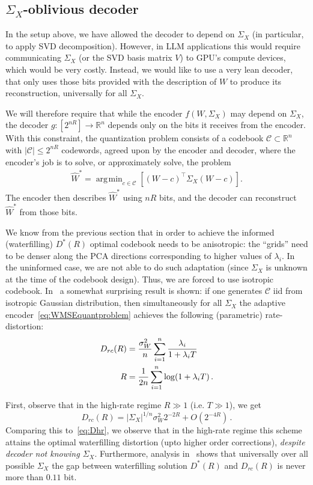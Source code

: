 \documentclass[journal]{IEEEtran}
\newcommand{\RR}{\mathbb{R}}
\newcommand{\m}{\mathcal}
\DeclareMathOperator*{\argmin}{\arg\!\min}
\begin{document}
\fi


\subsection{$\Sigma_X$-oblivious decoder}\label{sec:universal_decoder}

In the setup above, we have allowed the decoder to depend on $\Sigma_X$ (in particular, to apply
SVD decomposition). However, in LLM applications this would require communicating $\Sigma_X$ (or
the SVD basis matrix $V$) to GPU's compute devices, which would be very costly. Instead, we would
like to use a very lean decoder, that only uses those bits provided with the description of $W$ to
produce its reconstruction, universally for all $\Sigma_X$.

We will therefore require that while the encoder $f(W,\Sigma_X)$ may depend on $\Sigma_X$, the decoder $g:[2^{nR}]\to \RR^n$ depends only on the bits it receives from the encoder. With this constraint, the quantization problem consists of a codebook $\m{C}\subset\RR^n$ with $|\m{C}|\leq 2^{nR}$ codewords, agreed upon by the encoder and decoder, where the encoder's job is to solve, or approximately solve, the problem
\begin{align}
\hat{W}^*=\argmin_{c\in\m{C}}[(W-c)^\top \Sigma_X (W-c)].
\label{eq:WMSEquantproblem}
\end{align}
The encoder then describes $\hat{W}^*$ using $nR$ bits, and the decoder can reconstruct $\hat{W}^*$ from those bits.

We know from the previous section that in order to achieve the informed (waterfilling) $D^*(R)$
optimal codebook needs to be anisotropic: the ``grids'' need to be denser along the PCA directions
corresponding to higher values of $\lambda_i$. In the uninformed case, we are not able to do such
adaptation (since $\Sigma_X$ is unknown at the time of the codebook design). Thus, we are forced
to use isotropic codebook. In~\cite{HOP26} a somewhat
surprising result is shown: if one generates $\m{C}$ iid from isotropic Gaussian distribution,
then simultaneously for all $\Sigma_X$ the adaptive encoder~\eqref{eq:WMSEquantproblem} achieves
the following (parametric) rate-distortion:
\begin{align*} D_{rc}(R) &= {\sigma_W^2 \over n} \sum_{i=1}^n {\lambda_i\over 1 +
\lambda_iT}\\
   R &= {1\over 2n} \sum_{i=1}^n \log (1+ \lambda_i T)\,.
\end{align*}

First, observe that in the high-rate regime $R\gg 1$ (i.e. $T\gg 1$), we get
$$ D_{rc}(R) = |\Sigma_X|^{1/n} \sigma_W^2 2^{-2R} + O(2^{-4R})\,.$$
Comparing this to~\eqref{eq:Dhr}, we observe that in the high-rate regime this scheme attains the
optimal waterfilling distortion (upto higher order corrections), \textit{despite decoder not
knowing $\Sigma_X$}. Furthermore, analysis in~\cite{HOP26} shows that universally over all
possible $\Sigma_X$ the gap between waterfilling solution $D^*(R)$ and $D_{rc}(R)$ is never more
than $0.11$ bit.
\end{document}
